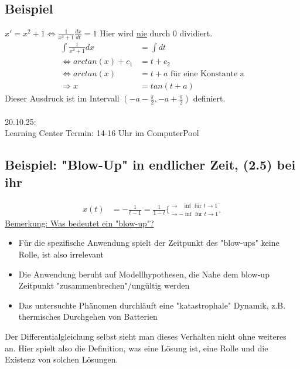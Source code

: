 \documentclass[12pt,a4paper]{article}
\newcommand{\DGL}{Differentialgleichung }
\begin{document}
\subsection{Beispiel}
$x' = x^2 + 1 \Leftrightarrow \frac{1}{x^2+1} \frac{dx}{dt} = 1$ Hier wird \underline{nie} durch 0 dividiert. \\
\begin{align*}
\int \frac{1}{x^2+1} dx &= \int dt \\
\Leftrightarrow arctan(x) + c_1 &= t+c_2 \\
\Leftrightarrow arctan(x) &= t+a \text{ für eine Konstante a}\\
\Rightarrow x &= tan(t+a)
\end{align*}
Dieser Ausdruck ist im Intervall $(-a-\frac{\pi}{2}, -a+\frac{\pi}{2})$ definiert. \\
\\
20.10.25: \\
Learning Center Termin: 14-16 Uhr im ComputerPool \\
\subsection{Beispiel: "Blow-Up" in endlicher Zeit, (2.5) bei ihr}
\begin{align*}
x(t) &= - \frac{1}{t-1} = \frac{1}{1-t} \{^{\rightarrow \text{ } \inf \text{ für } t \rightarrow 1^-}_{\rightarrow -\inf \text{ für } t \rightarrow 1^+}
\end{align*}
\underline{Bemerkung: Was bedeutet ein "blow-up"?}
\begin{itemize}
\item Für die spezifische Anwendung spielt der Zeitpunkt des "blow-ups" keine Rolle, ist also irrelevant
\item Die Anwendung beruht auf Modellhypothesen, die Nahe dem blow-up Zeitpunkt "zusammenbrechen"/ungültig werden
\item Das untersuchte Phänomen durchläuft eine "katastrophale" Dynamik, z.B. thermisches Durchgehen von Batterien
\end{itemize}
Der \DGL selbst sieht man dieses Verhalten nicht ohne weiteres an. Hier spielt also die Definition, was eine Lösung ist, eine Rolle und die Existenz von solchen Lösungen.
\end{document}

